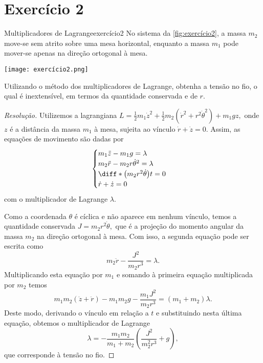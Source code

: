 \section*{Exercício 2}
\begin{exercício}{Multiplicadores de Lagrange}{exercício2}
    No sistema da \cref{fig:exercício2}, a massa \(m_2\) move-se sem atrito sobre uma mesa horizontal, enquanto a massa \(m_1\) pode mover-se apenas na direção ortogonal à mesa.

    \begin{center}
        \texttt{[image: exercício2.png]}
    \end{center}

    Utilizando o método dos multiplicadores de Lagrange, obtenha a tensão no fio, o qual é inextensível, em termos da quantidade conservada e de \(r\).
\end{exercício}
\begin{proof}[Resolução]
    Utilizemos a lagrangiana \(L = \frac12m_1\dot{z}^2 + \frac12 m_2\left(\dot{r}^2 + r^2\dot{\theta}^2\right) + m_1gz,\) onde \(z\) é a distância da massa \(m_1\) à mesa, sujeita ao vínculo \( \dot{r} + \dot{z} = 0.\) Assim, as equações de movimento são dadas por
    \begin{equation*}
        \begin{cases}
            m_1 \ddot{z} - m_1 g = \lambda\\
            m_2 \ddot{r} - m_2r \dot{\theta}^2 = \lambda\\
            \diff*{\left(m_2 r^2\dot{\theta}\right)}{t} = 0\\
            \dot{r} + \dot{z} = 0
        \end{cases}
    \end{equation*}
    com o multiplicador de Lagrange \(\lambda\).

    Como a coordenada \(\theta\) é cíclica e não aparece em nenhum vínculo, temos a quantidade conservada \(J = m_2r^2\dot\theta,\) que é a projeção do momento angular da massa \(m_2\) na direção ortogonal à mesa. Com isso, a segunda equação pode ser escrita como
    \begin{equation*}
        m_2\ddot{r} - \frac{J^2}{m_2r^3} = \lambda.
    \end{equation*}
    Multiplicando esta equação por \(m_1\) e somando à primeira equação multiplicada por \(m_2\) temos
    \begin{equation*}
        m_1m_2(\ddot{z}+\ddot{r}) - m_1m_2g - \frac{m_1J^2}{m_2r^3} = (m_1 + m_2) \lambda.
    \end{equation*}
    Deste modo, derivando o vínculo em relação a \(t\) e substituindo nesta última equação, obtemos o multiplicador de Lagrange
    \begin{equation*}
        \lambda = - \frac{m_1 m_2}{m_1 + m_2}\left(\frac{J^2}{m_2^2 r^3} + g\right),
    \end{equation*}
    que corresponde à tensão no fio.
\end{proof}

